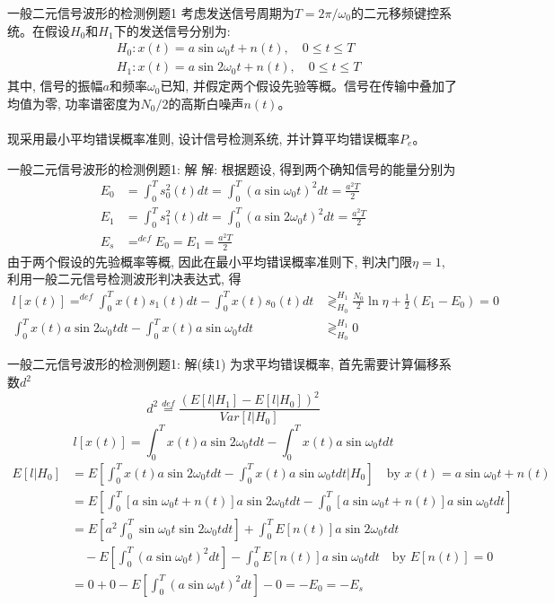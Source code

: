 \begin{frame}{一般二元信号波形的检测例题1}
考虑发送信号周期为$T=2\pi/\omega_0$的二元移频键控系统。在假设$H_0$和$H_1$下的发送信号分别为:
\begin{align*}
&H_0: x(t)=a\sin\omega_0t+n(t), \quad 0\le t\le T\\
&H_1: x(t)=a\sin2\omega_0t+n(t), \quad 0\le t\le T
\end{align*}
其中, 信号的振幅$a$和频率$\omega_0$已知, 并假定两个假设先验等概。信号在传输中叠加了均值为零, 功率谱密度为$N_0/2$的高斯白噪声$n(t)$。\\
~\\
现采用最小平均错误概率准则, 设计信号检测系统, 并计算平均错误概率$P_e$。
\end{frame}

\begin{frame}{一般二元信号波形的检测例题1: 解}
解: 根据题设, 得到两个确知信号的能量分别为
\begin{align*}
E_0&=\int_{0}^{T}s_0^2(t)dt=\int_{0}^{T}(a\sin\omega_0t)^2dt=\frac{a^2T}{2}\\
E_1&=\int_{0}^{T}s_1^2(t)dt=\int_{0}^{T}(a\sin2\omega_0t)^2dt=\frac{a^2T}{2}\\
E_s&\mathop{=}^{def}E_0=E_1=\frac{a^2T}{2}
\end{align*}
由于两个假设的先验概率等概, 因此在最小平均错误概率准则下, 判决门限$\eta=1$, 利用一般二元信号检测波形判决表达式, 得
\begin{align*}
l[x(t)]\mathop{=}^{def}\int_{0}^{T}x(t)s_1(t)dt-\int_{0}^{T}x(t)s_0(t)dt&\mathop{\gtrless}_{H_0}^{H_1}\frac{N_0}{2}\ln\eta+\frac{1}{2}(E_1-E_0)=0\\
\int_{0}^{T}x(t)a\sin2\omega_0tdt-\int_{0}^{T}x(t)a\sin\omega_0tdt&\mathop{\gtrless}_{H_0}^{H_1}0
\end{align*}
\end{frame}

\begin{frame}[shrink]{一般二元信号波形的检测例题1: 解(续1)}
为求平均错误概率, 首先需要计算偏移系数$d^2$
\[d^2\mathop{=}\limits^{def}\frac{\left(E[l|H_1]-E[l|H_0]\right)^2}{Var[l|H_0]}\]
\[
l[x(t)]=\int_{0}^{T}x(t)a\sin2\omega_0tdt-\int_{0}^{T}x(t)a\sin\omega_0tdt \]
\begin{align*}
E[l|H_0]&=E\left[\int_{0}^{T}x(t)a\sin2\omega_0tdt-\int_{0}^{T}x(t)a\sin\omega_0tdt|H_0\right]\quad \text{by } x(t)=a\sin\omega_0t+n(t)\\
&=E\left[\int_{0}^{T}[a\sin\omega_0t+n(t)]a\sin2\omega_0tdt-\int_{0}^{T}[a\sin\omega_0t+n(t)]a\sin\omega_0tdt\right]\\
&=E\left[a^2\int_{0}^{T}\sin\omega_0t\sin2\omega_0tdt\right]+\int_{0}^{T}E[n(t)]a\sin2\omega_0tdt\\
&\quad -E\left[\int_{0}^{T}(a\sin\omega_0t)^2dt\right]-\int_{0}^{T}E[n(t)]a\sin\omega_0tdt\quad\text{by }E[n(t)]=0\\
&=0+0-E\left[\int_{0}^{T}(a\sin\omega_0t)^2dt\right]-0=-E_0=-E_s
\end{align*}
\end{frame}

